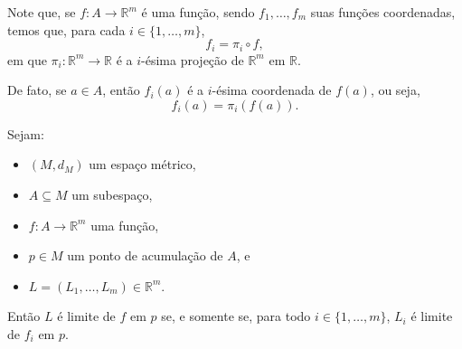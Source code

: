 Note que, se $f:A\to \mathbb R^m$ é uma função, sendo $f_1, \dots, f_m$ suas funções coordenadas, temos que, para cada $i\in\{1,\dots,m\}$,
\[
    f_i = \pi_i \circ f,
\]
em que $\pi_i:\mathbb R^m\to\mathbb R$ é a $i$-ésima projeção de $\mathbb R^m$ em $\mathbb R$.

De fato, se $a\in A$, então $f_i(a)$ é a $i$-ésima coordenada de $f(a)$, ou seja,
\[
    f_i(a)=\pi_i(f(a)).
\]

\begin{proposition}
    Sejam:
    \begin{itemize}
        \item $(M, d_M)$ um espaço métrico,
        \item $A\subseteq M$ um subespaço,
        \item $f: A \to \mathbb R^m$ uma função,
        \item $p \in M$ um ponto de acumulação de $A$, e
        \item $L=(L_1, \dots, L_m)\in \mathbb R^m$.
    \end{itemize}

    Então $L$ é limite de $f$ em $p$ se, e somente se, para todo $i \in \{1, \dots, m\}$, $L_i$ é limite de $f_i$ em $p$.
\end{proposition}

